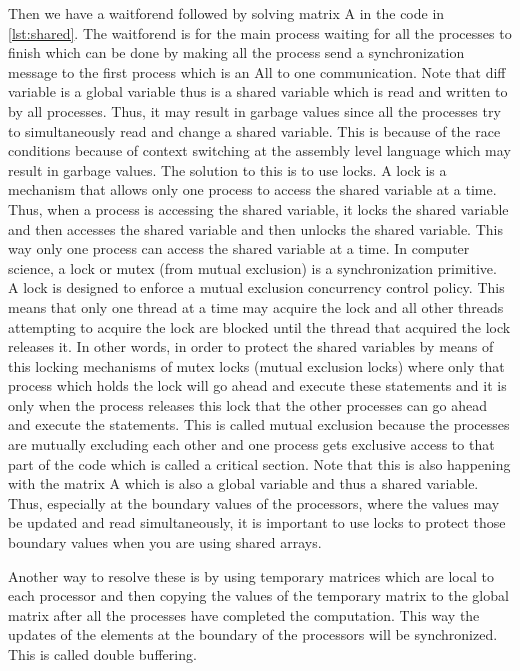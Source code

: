 \documentclass[12pt]{article}
\begin{document}
Then we have a waitforend followed by solving matrix A in the code in \ref{lst:shared}.
The waitforend is for the main process waiting for all the processes to finish which can be done by making all the process 
send a synchronization message to the first process which is an All to one communication.
Note that diff variable is a global variable thus is a shared variable which is read and written to by all processes.
Thus, it may result in garbage values since all the processes try to simultaneously read and change a shared variable. This is because of the race conditions
because of context switching at the assembly level language which may result in garbage values.
The solution to this is to use locks. A lock is a mechanism that allows only one process to access the shared variable at a time. Thus, when a process is accessing the shared variable, it locks the shared variable and then
accesses the shared variable and then unlocks the shared variable. This way only one process can access the shared variable at a time.
In computer science, a lock or mutex (from mutual exclusion) is a synchronization primitive. A lock is designed to enforce a mutual exclusion concurrency control policy. This means that only one thread at a time may acquire the lock and all other threads attempting to acquire the lock are blocked until the thread that acquired the lock releases it.
In other words, in order to protect the shared variables by means of this locking mechanisms of mutex locks (mutual exclusion locks) where only that
process which holds the lock will go ahead and execute these statements and it is only when the process releases this lock 
that the other processes can go ahead and execute the statements. This is called mutual exclusion because the processes are mutually
excluding each other and one process gets exclusive access to that part of the code which is called a critical section.
Note that this is also happening with the matrix A which is also a global variable and thus a shared variable. Thus, especially at the boundary values
of the processors, where the values may be updated and read simultaneously, it is important to
use locks to protect those boundary values when you are using shared arrays.

Another way to resolve these is by using temporary matrices which are local to each processor and then copying the values of the temporary matrix to the global matrix after all the processes have completed the computation.
This way the updates of the elements at the boundary of the processors will be synchronized. This is called double buffering.
\end{document}
